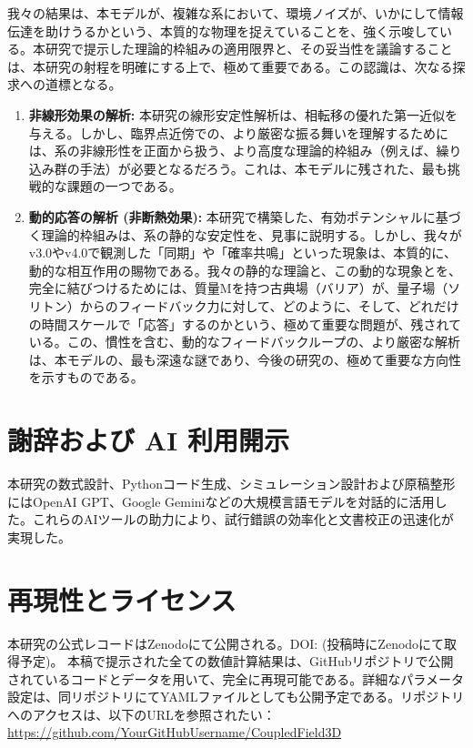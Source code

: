 \documentclass[a4paper,11pt,ja=standard,lualatex]{bxjsarticle}
\begin{document}
我々の結果は、本モデルが、複雑な系において、環境ノイズが、いかにして情報伝達を助けうるかという、本質的な物理を捉えていることを、強く示唆している。本研究で提示した理論的枠組みの適用限界と、その妥当性を議論することは、本研究の射程を明確にする上で、極めて重要である。この認識は、次なる探求への道標となる。
\begin{enumerate}
    \item \textbf{非線形効果の解析:} 本研究の線形安定性解析は、相転移の優れた第一近似を与える。しかし、臨界点近傍での、より厳密な振る舞いを理解するためには、系の非線形性を正面から扱う、より高度な理論的枠組み（例えば、繰り込み群の手法）が必要となるだろう。これは、本モデルに残された、最も挑戦的な課題の一つである。
    \item \textbf{動的応答の解析 (非断熱効果):} 本研究で構築した、有効ポテンシャルに基づく理論的枠組みは、系の静的な安定性を、見事に説明する。しかし、我々がv3.0やv4.0で観測した「同期」や「確率共鳴」といった現象は、本質的に、動的な相互作用の賜物である。我々の静的な理論と、この動的な現象とを、完全に結びつけるためには、質量Mを持つ古典場（バリア）が、量子場（ソリトン）からのフィードバック力に対して、どのように、そして、どれだけの時間スケールで「応答」するのかという、極めて重要な問題が、残されている。この、慣性を含む、動的なフィードバックループの、より厳密な解析は、本モデルの、最も深遠な謎であり、今後の研究の、極めて重要な方向性を示すものである。
\end{enumerate}

\section*{謝辞および AI 利用開示}
本研究の数式設計、Pythonコード生成、シミュレーション設計および原稿整形にはOpenAI GPT、Google Geminiなどの大規模言語モデルを対話的に活用した。これらのAIツールの助力により、試行錯誤の効率化と文書校正の迅速化が実現した。

\section*{再現性とライセンス}
本研究の公式レコードはZenodoにて公開される。DOI: (投稿時にZenodoにて取得予定)。
本稿で提示された全ての数値計算結果は、GitHubリポジトリで公開されているコードとデータを用いて、完全に再現可能である。詳細なパラメータ設定は、同リポジトリにてYAMLファイルとしても公開予定である。リポジトリへのアクセスは、以下のURLを参照されたい：\url{https://github.com/YourGitHubUsername/CoupledField3D}
\end{document}
